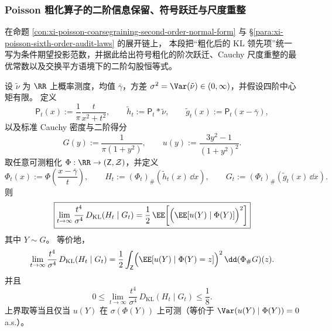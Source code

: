 \subsubsection{Poisson 粗化算子的二阶信息保留、符号跃迁与尺度重整}\label{subsubsec:xi-poisson-coarsegraining-operator-projection-laws}
在命题 \ref{con:xi-poisson-coarsegraining-second-order-normal-form} 与
\S\ref{para:xi-poisson-sixth-order-audit-laws} 的展开链上，
本段把“粗化后的 KL 领先项”统一写为条件期望投影范数，并据此给出符号粗化的阶次跃迁、Cauchy 尺度重整的最优常数以及交换平方语境下的二阶勾股恒等式。


\begin{theorem}[任意粗化算子下的二阶信息保留定律]\label{thm:xi-poisson-kl-coarsegraining-projection-coefficient}
设 \(\tilde\nu\) 为 \(\RR\) 上概率测度，均值 \(\bar\gamma\)，方差
\(
\sigma^2=\Var(\tilde\nu)\in(0,\infty)
\)，并假设四阶中心矩有限。
定义
\[
\mathsf P_t(x):=\frac{1}{\pi}\frac{t}{x^2+t^2},\qquad
\tilde h_t:=\mathsf P_t*\tilde\nu,\qquad
\tilde g_t(x):=\mathsf P_t(x-\bar\gamma),
\]
以及标准 Cauchy 密度与二阶得分
\[
G(y):=\frac{1}{\pi(1+y^2)},\qquad
u(y):=\frac{3y^2-1}{(1+y^2)^2}.
\]
取任意可测粗化 \(\Phi:\RR\to(\mathsf Z,\mathcal Z)\)，并定义
\[
\Phi_t(x):=\Phi\!\left(\frac{x-\bar\gamma}{t}\right),\qquad
H_t:=(\Phi_t)_{\#}(\tilde h_t(x)\,\dd x),\qquad
G_t:=(\Phi_t)_{\#}(\tilde g_t(x)\,\dd x).
\]
则
\begin{equation}\label{eq:xi-poisson-kl-coarsegraining-projection-limit}
\boxed{
\lim_{t\to\infty}\frac{t^4}{\sigma^4}\,D_{\mathrm{KL}}(H_t\mid G_t)
=\frac12\,\EE\!\left[\Bigl(\EE[u(Y)\mid \Phi(Y)]\Bigr)^2\right]
}
\end{equation}
其中 \(Y\sim G\)。
等价地，
\[
\lim_{t\to\infty}\frac{t^4}{\sigma^4}\,D_{\mathrm{KL}}(H_t\mid G_t)
=\frac12\int_{\mathsf Z}\Bigl(\EE[u(Y)\mid \Phi(Y)=z]\Bigr)^2\,\dd(\Phi_{\#}G)(z).
\]
并且
\begin{equation}\label{eq:xi-poisson-kl-coarsegraining-projection-bounds}
0\le
\lim_{t\to\infty}\frac{t^4}{\sigma^4}\,D_{\mathrm{KL}}(H_t\mid G_t)
\le \frac18.
\end{equation}
上界取等当且仅当 \(u(Y)\) 在 \(\sigma(\Phi(Y))\) 上可测（等价于
\(\Var(u(Y)\mid \Phi(Y))=0\) a.s.）。
\end{theorem}

